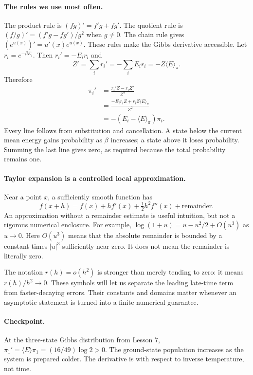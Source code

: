 \documentclass[11pt]{article}
\begin{document}
\paragraph{The rules we use most often.}
The product rule is $(fg)'=f'g+fg'$. The quotient rule is
$(f/g)'=(f'g-fg')/g^2$ when $g\ne0$. The chain rule gives
$(e^{u(x)})'=u'(x)e^{u(x)}$. These rules make the Gibbs derivative accessible.
Let $r_i=e^{-\beta E_i}$. Then $r_i'=-E_i r_i$ and
\[
Z'=\sum_i r_i'=-\sum_i E_i r_i=-Z\langle E\rangle_\pi.
\]
Therefore
\begin{align*}
\pi_i'&=\frac{r_i'Z-r_iZ'}{Z^2}\\
&=\frac{-E_i r_i Z+r_i Z\langle E\rangle_\pi}{Z^2}\\
&=-(E_i-\langle E\rangle_\pi)\pi_i.
\end{align*}
Every line follows from substitution and cancellation. A state below the
current mean energy gains probability as $\beta$ increases; a state above it
loses probability. Summing the last line gives zero, as required because the
total probability remains one.

\paragraph{Taylor expansion is a controlled local approximation.}
Near a point $x$, a sufficiently smooth function has
\[
f(x+h)=f(x)+h f'(x)+\tfrac12h^2f''(x)+\text{remainder}.
\]
An approximation without a remainder estimate is useful intuition, but not a
rigorous numerical enclosure. For example,
$\log(1+u)=u-u^2/2+O(u^3)$ as $u\to0$. Here $O(u^3)$ means that the absolute
remainder is bounded by a constant times $|u|^3$ sufficiently near zero.
It does not mean the remainder is literally zero.

The notation $r(h)=o(h^2)$ is stronger than merely tending to zero: it means
$r(h)/h^2\to0$. These symbols will let us separate the leading late-time term
from faster-decaying errors. Their constants and domains matter whenever an
asymptotic statement is turned into a finite numerical guarantee.

\paragraph{Checkpoint.}
At the three-state Gibbs distribution from Lesson 7,
$\pi_1'=\langle E\rangle\pi_1=(16/49)\log2>0$. The ground-state population
increases as the system is prepared colder. The derivative is with respect to
inverse temperature, not time.
\end{document}
